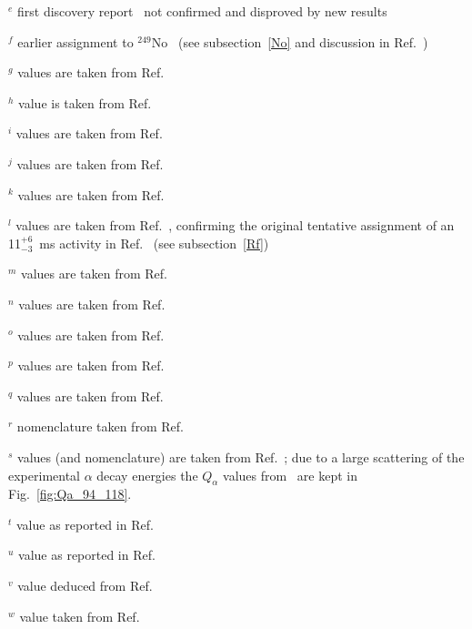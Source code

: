 \begin{center}
\begin{tablenotes}
\item{$^e$} first discovery report~\cite{TerAkopian1975} not confirmed and disproved by new results~\cite{Oganessian2001,Belozerov2003,Peterson2006}
\item{$^f$} earlier assignment to $^{249}$No~\cite{Belozerov2003,Popeko2003,Yeremin2003} (see subsection~\ref{No} and discussion in Ref.~\cite{Peterson2006})
\item{$^g$} values are taken from Ref.~\cite{Kessaci2021}
\item{$^h$} value is taken from Ref.~\cite{Pore2024a}
\item{$^i$} values are taken from Ref.~\cite{Vostinar2019}
\item{$^j$} values are taken from Ref.~\cite{Oganessian2022d}
\item{$^k$} values are taken from Ref.~\cite{Khuyagbaatar2025}
\item{$^l$} values are taken from Ref.~\cite{Khuyagbaatar2021}, confirming the original tentative assignment of an 11$^{+6}_{-3}$~ms activity in Ref.~\cite{Hessberger1997} (see subsection~\ref{Rf})
\item{$^m$} values are taken from Ref.~\cite{Mosat2020}
\item{$^n$} values are taken from Ref.~\cite{Oganessian2024} 
\item{$^o$} values are taken from Ref.~\cite{Oganessian2022b}
\item{$^p$} values are taken from Ref.~\cite{Pore2024}
\item{$^q$} values are taken from Ref.~\cite{Oganessian2023} 
\item{$^r$} nomenclature taken from Ref.~\cite{Haba2012}
\item{$^s$} values (and nomenclature) are taken from Ref.~\cite{ZhaoZ2024}; due to a large scattering of the experimental $\alpha$ decay energies the $Q_\alpha$ values from~\cite{Wang2021} are kept in Fig.~\ref{fig:Qa_94_118}.
\item{$^t$} value as reported in Ref.~\cite{Utyonkov2018}
\item{$^u$} value as reported in Ref.~\cite{Hofmann2000}  
\item{$^v$} value deduced from Ref.~\cite{Kaji2017}
\item{$^w$} value taken from Ref.~\cite{Oganessian2025}
\vspace{-0.3 cm} 
\end{tablenotes}   
\end{center}
\twocolumn


